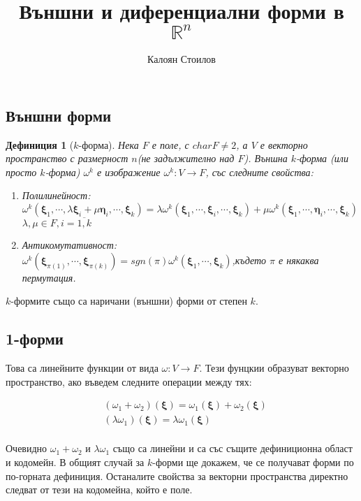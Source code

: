 \documentclass[12pt]{article}
\title{Външни и диференциални форми в $\mathbb{R}^n$}
\author{Калоян Стоилов}
\newtheorem{definition}{Дефиниция}[section]
\newcommand\func[3]{#1:#2 \to #3}
\newcommand\nstfunc[1]{\func{#1}{V}{F}}
\newcommand\myxi[0]{\boldsymbol{\xi}}
\newcommand\myeta[0]{\boldsymbol{\eta}}
\begin{document}
\maketitle
\begin{large}
  \tableofcontents{}

  \section{Външни форми}
  \begin{definition}[$k$-форма] Нека $F$ е поле, с $char F \neq 2$, а $V$ е векторно пространство с размерност $n$(не задължително над $F$). Външна $k$-форма (или просто $k$-форма) $\omega^k$ е изображение $\func{\omega^k}{V}{F}$, със следните свойства:
    \begin{enumerate}
      \item Полилинейност: \\
        $\omega^k(\myxi_1,\cdots,\lambda\myxi_i+\mu\myeta_i,\cdots,\myxi_k)=\lambda\omega^k(\myxi_1,\cdots,\myxi_i,\cdots,\myxi_k)+\mu\omega^k(\myxi_1,\cdots,\myeta_i,\cdots,\myxi_k)$ \\
        $\lambda,\mu \in F, i=\overline{1,k}$
      \item Антикомутативност: \\
        $\omega^k(\myxi_{\pi(1)},\cdots,\myxi_{\pi(k)})=sgn(\pi)\omega^k(\myxi_1,\cdots,\myxi_k)$,където $\pi$ е някаква пермутация.
    \end{enumerate}
  \end{definition}

  $k$-формите също са наричани (външни) форми от степен $k$.


  \subsection{1-форми}

  Това са линейните функции от вида $\nstfunc{\omega}$.
  Тези фунцкии образуват векторно пространство, ако въведем следните операции между тях:

  \begin{align*}
    &(\omega_1+\omega_2)(\myxi)=\omega_1(\myxi)+\omega_2(\myxi) \\
    &(\lambda\omega_1)(\myxi)=\lambda\omega_1(\myxi) \\
  \end{align*}

  Очевидно $\omega_1+\omega_2$ и $\lambda\omega_1$ също са линейни и са със същите дефиниционна област и кодомейн. В общият случай за $k$-форми ще докажем, че се получават форми по по-горната дефиниция. Останалите свойства за векторни пространства директно следват от тези на кодомейна, който е поле.\\


\end{large}
\end{document}
